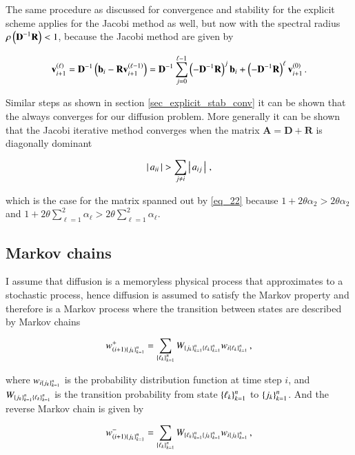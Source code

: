 \documentclass[11pt,english,a4paper]{article}
\begin{document}
\begin{flushleft}
The same procedure as discussed for convergence and stability for the explicit scheme applies for the Jacobi method as well, but now with the spectral radius $\rho\left({\textbf{D}^{-1} \textbf{R}}\right) < 1$, because the Jacobi method are given by 

\begin{align*}
\textbf{v}_{i+1}^{\left({\ell}\right)} = \textbf{D}^{-1}\left({\textbf{b}_i - \textbf{R}\textbf{v}_{i+1}^{\left({\ell-1}\right)}}\right) = \textbf{D}^{-1}\sum_{j=0}^{\ell-1} \left({-\textbf{D}^{-1}\textbf{R}}\right)^j \textbf{b}_i + \left({-\textbf{D}^{-1}\textbf{R}}\right)^\ell\textbf{v}_{i+1}^{(0)} \,.
\end{align*}

Similar steps as shown in section \ref{sec_explicit_stab_conv} it can be shown that the always converges for our diffusion problem. More generally it can be shown that the Jacobi iterative method converges when the matrix $\textbf{A} = \textbf{D}+ \textbf{R}$ is diagonally dominant 

\begin{align*}
\left\vert{\,a_{ii}\,}\right\vert > \sum_{j\neq i} \left\vert{\,a_{ij}\,}\right\vert\,,
\end{align*}

which is the case for the matrix spanned out by \eqref{eq_22} because $1+2\theta \alpha_2 > 2\theta \alpha_2$ and $1+2\theta\sum_{\ell=1}^2 \alpha_{\ell} > 2\theta\sum_{\ell=1}^2 \alpha_\ell$.

\subsection{Markov chains}

I assume that diffusion is a memoryless physical process that approximates to a stochastic process, hence diffusion is assumed to satisfy the Markov property and therefore is a Markov process where the transition between states are described by Markov chains 

\begin{align}
w_{(i+1)\left\lbrace{j_k}\right\rbrace_{k=1}^n}^+ = \sum_{\left\lbrace{\ell_k}\right\rbrace_{k=1}^n} W_{\left\lbrace{j_k}\right\rbrace_{k=1}^n\left\lbrace{\ell_k}\right\rbrace_{k=1}^n} w_{i\left\lbrace{\ell_k}\right\rbrace_{k=1}^n} \,,
\label{eq_37}
\end{align}

where $w_{i\left\lbrace{j_k}\right\rbrace_{k=1}^n}$ is the probability distribution function  at time step $i$, and $W_{\left\lbrace{j_k}\right\rbrace_{k=1}^n\left\lbrace{\ell_k}\right\rbrace_{k=1}^n}$  is the transition probability from state $\left\lbrace{\ell_k}\right\rbrace_{k=1}^n$ to $\left\lbrace{j_k}\right\rbrace_{k=1}^n$. And the reverse Markov chain is given by

\begin{align}
w_{(i+1)\left\lbrace{j_k}\right\rbrace_{k=1}^n}^- = \sum_{\left\lbrace{\ell_k}\right\rbrace_{k=1}^n} W_{\left\lbrace{\ell_k}\right\rbrace_{k=1}^n\left\lbrace{j_k}\right\rbrace_{k=1}^n} w_{i\left\lbrace{j_k}\right\rbrace_{k=1}^n} \,,
\label{eq_38}
\end{align}


\end{flushleft}
\end{document}
